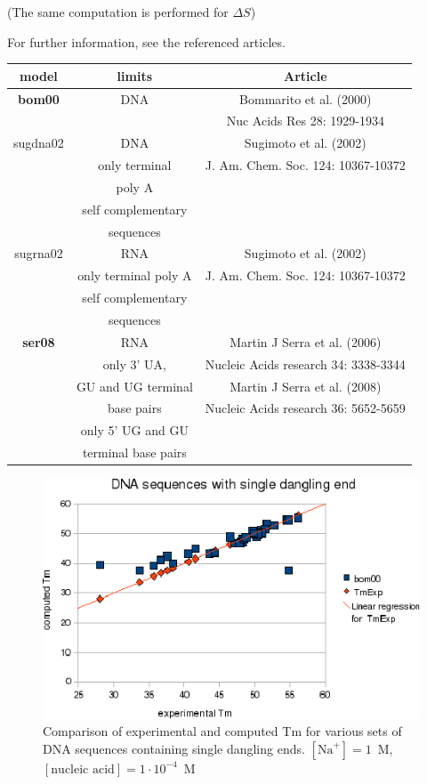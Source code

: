 \documentclass{article}
\begin{document}
       (The same computation is performed for $\Delta S$)

For further information, see the referenced articles.

\begin{table}[h][c]
\begin{tabular}[h]{| c | c | c |}
\textbf{model} & \textbf{limits} & \textbf{Article} \\
\hline
\textbf{bom00} & DNA & Bommarito et al. (2000) \\
 & & Nuc Acids Res 28: 1929-1934 \\
\hline
sugdna02 & DNA & Sugimoto et al. (2002) \\
 & only terminal & J. Am. Chem. Soc. 124: 10367-10372 \\
 & poly A & \\
 & self complementary & \\
 & sequences & \\
 \hline
sugrna02 & RNA & Sugimoto et al. (2002) \\
 & only terminal poly A & J. Am. Chem. Soc. 124: 10367-10372 \\
 & self complementary & \\
 & sequences & \\
 \hline
\textbf{ser08} & RNA & Martin J Serra et al. (2006) \\
 & only 3' UA, & Nucleic Acids research 34: 3338-3344 \\
 & GU and UG terminal & Martin J Serra et al. (2008) \\
 & base pairs & Nucleic Acids research 36: 5652-5659 \\
 & only 5' UG and GU & \\
 & terminal base pairs & \\
 \hline
\end{tabular}
\end{table}

\begin{figure}[h]
\includegraphics[width=1\linewidth]{images/DNASingleDanglingEnd}
\caption{Comparison of experimental and computed Tm for various sets of
 DNA sequences containing single dangling ends. $[\mbox{Na}^+] = 1$~M, $[\mbox{nucleic acid}] = 1\cdot{}10^{-4}$~M}
\end{figure}
\end{document}
